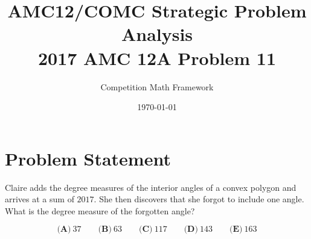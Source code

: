 \documentclass[]{article}
\begin{document}
\title{AMC12/COMC Strategic Problem Analysis\\
\large 2017 AMC 12A Problem 11}
\author{Competition Math Framework}
\date{\today}
\maketitle

\section*{Problem Statement}

Claire adds the degree measures of the interior angles of a convex polygon and arrives at a sum of $2017$. She then discovers that she forgot to include one angle. What is the degree measure of the forgotten angle?

$$\textbf{(A)}\ 37\qquad\textbf{(B)}\ 63\qquad\textbf{(C)}\ 117\qquad\textbf{(D)}\ 143\qquad\textbf{(E)}\ 163$$
\end{document}
